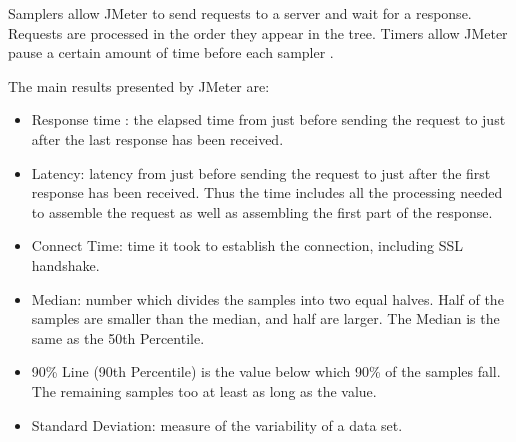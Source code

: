 Samplers allow JMeter to send requests to a server and wait for a response. Requests are processed in the order they appear in the tree. Timers allow JMeter   pause a certain amount of time before each sampler \cite{Nevedrov2007}  \cite{Halili2008}.

The main results presented by JMeter are:

\begin{itemize}
\item Response time : the elapsed time from just before sending the request to just after the last response has been received.
\item Latency: latency from just before sending the request to just after the first response has been received. Thus the time includes all the processing needed to assemble the request as well as assembling the first part of the response.
\item Connect Time: time it took to establish the connection, including SSL handshake. 
\item Median:  number which divides the samples into two equal halves. Half of the samples are smaller than the median, and half are larger. The Median is the same as the 50th Percentile.
\item 90\% Line (90th Percentile) is the value below which 90\% of the samples fall. The remaining samples too at least as long as the value. 
\item Standard Deviation:  measure of the variability of a data set. 
\end{itemize}